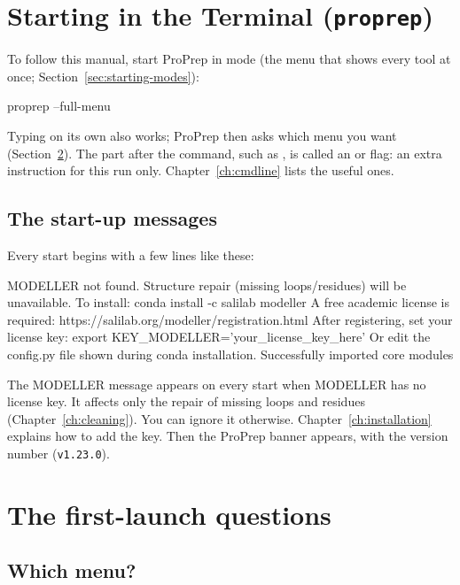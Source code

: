 \section{Starting in the Terminal (\texttt{proprep})}\label{sec:starting-terminal}

To follow this manual, start ProPrep in  mode (the menu that
shows every tool at once; Section~\ref{sec:starting-modes}):

\begin{terminal}
proprep --full-menu
\end{terminal}

Typing  on its own also works; ProPrep then asks which menu you
want (Section~\ref{sec:starting-questions}). The part after the command, such as
, is called an  or flag: an extra instruction
for this run only. Chapter~\ref{ch:cmdline} lists the useful ones.

\subsection*{The start-up messages}

Every start begins with a few lines like these:

\begin{screen}
MODELLER not found. Structure repair (missing loops/residues) will be unavailable.
  To install: conda install -c salilab modeller
  A free academic license is required: https://salilab.org/modeller/registration.html
  After registering, set your license key:
    export KEY_MODELLER='your_license_key_here'
  Or edit the config.py file shown during conda installation.
Successfully imported core modules
\end{screen}

The MODELLER message appears on every start when MODELLER has no license key. It
affects only the repair of missing loops and residues (Chapter~\ref{ch:cleaning}).
You can ignore it otherwise. Chapter~\ref{ch:installation} explains how to add
the key. Then the ProPrep banner appears, with the version number
(\texttt{v1.23.0}).

\section{The first-launch questions}\label{sec:starting-questions}

\subsection*{Which menu?}

